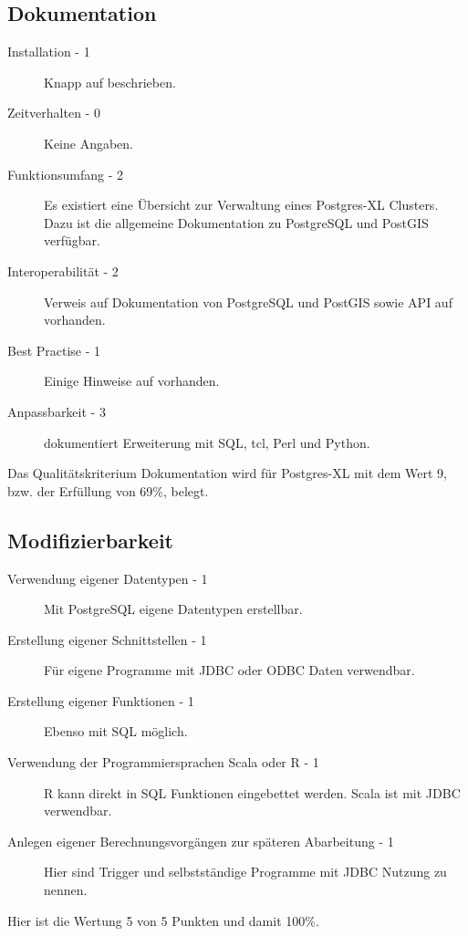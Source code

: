 \subsection{Dokumentation}
\begin{description}
\item[Installation - 1] Knapp auf \cite{website:postgresxl-install} beschrieben.
\item[Zeitverhalten - 0] Keine Angaben.
\item[Funktionsumfang - 2] Es existiert eine Übersicht zur Verwaltung eines Postgres-XL Clusters. Dazu ist die allgemeine Dokumentation zu PostgreSQL und PostGIS verfügbar. \cite{website:postgresxl-manual}
\item[Interoperabilität - 2] Verweis auf Dokumentation von PostgreSQL und PostGIS sowie API auf \cite{website:postgresxl-api} vorhanden.
\item[Best Practise - 1] Einige Hinweise auf \cite{website:postgresxl-manual} vorhanden.
\item[Anpassbarkeit - 3] \cite{website:postgresxl-extend} dokumentiert Erweiterung mit SQL, tcl, Perl und Python.
\end{description}
Das Qualitätskriterium Dokumentation wird für Postgres-XL mit dem Wert 9, bzw. der Erfüllung von 69\%,  belegt.

\subsection{Modifizierbarkeit}
\begin{description}
\item[Verwendung eigener Datentypen - 1] Mit PostgreSQL eigene Datentypen erstellbar.
\item[Erstellung eigener Schnittstellen - 1] Für eigene Programme mit JDBC oder ODBC Daten verwendbar.
\item[Erstellung eigener Funktionen - 1] Ebenso mit SQL möglich.
\item[Verwendung der Programmiersprachen Scala oder R - 1] R kann direkt in SQL Funktionen eingebettet werden. Scala ist mit JDBC verwendbar.
\item[Anlegen eigener Berechnungsvorgängen zur späteren Abarbeitung - 1] Hier sind Trigger und selbstständige Programme mit JDBC Nutzung zu nennen.
\end{description}
Hier ist die Wertung 5 von 5 Punkten und damit 100\%.


